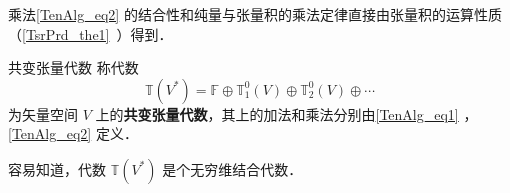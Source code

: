 乘法\autoref{TenAlg_eq2} 的结合性和纯量与张量积的乘法定律直接由张量积的运算性质（\autoref{TsrPrd_the1}~）得到．

\begin{definition}{共变张量代数}
称代数
\begin{equation}
\mathbb T(V^*)=\mathbb F\oplus\mathbb T_1^0(V)\oplus\mathbb T_2^0(V)\oplus\cdots
\end{equation}
为矢量空间 $V$ 上的\textbf{共变张量代数}，其上的加法和乘法分别由\autoref{TenAlg_eq1} ，\autoref{TenAlg_eq2} 定义．
\end{definition}

容易知道，代数 $\mathbb T(V^*)$ 是个无穷维结合代数．